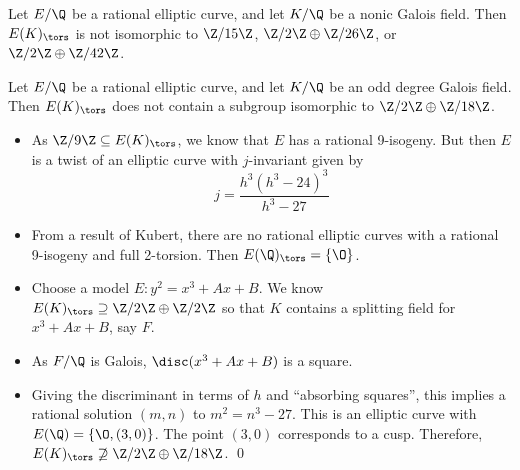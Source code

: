 \begin{frame}[plain,c]
\footnotesize

\begin{lem}[M.]
Let $E/\Q$ be a rational elliptic curve, and let $K/\Q$ be a nonic Galois field. Then $E(K)_\tors$ is not isomorphic to $\Z/15\Z$, $\Z/2\Z \oplus \Z/26\Z$, or $\Z/2\Z \oplus \Z/42\Z$. 
\end{lem}

\begin{lem}[M.]
Let $E/\Q$ be a rational elliptic curve, and let $K/\Q$ be an odd degree Galois field. Then $E(K)_\tors$ does not contain a subgroup isomorphic to $\Z/2\Z \oplus \Z/18\Z$. 
\end{lem}

\pfsk 
\begin{itemize} 
\item As $\Z/9\Z \subseteq E(K)_\tors$, we know that $E$ has a rational 9-isogeny. But then $E$ is a twist of an elliptic curve with $j$-invariant given by
	\[
	j= \dfrac{h^3(h^3 - 24)^3}{h^3 - 27}
	\]
\item From a result of Kubert, there are no rational elliptic curves with a rational 9-isogeny and full 2-torsion. Then $E(\Q)_\tors= \{ \O \}$. 
\item Choose a model $E: y^2= x^3 + Ax + B$. We know $E(K)_\tors \supseteq \Z/2\Z \oplus \Z/2\Z$ so that $K$ contains a splitting field for $x^3 + Ax + B$, say $F$. \item As $F/\Q$ is Galois, $\disc( x^3 + Ax + B)$ is a square. 
\item Giving the discriminant in terms of $h$ and ``absorbing squares'', this implies a rational solution $(m, n)$ to $m^2= n^3 - 27$. This is an elliptic curve with $E(\Q)= \{ \O, (3,0) \}$. The point $(3, 0)$ corresponds to a cusp. Therefore, $E(K)_\tors \not\supseteq \Z/2\Z \oplus \Z/18\Z$. \hfill\qed
\end{itemize}
\end{frame}





